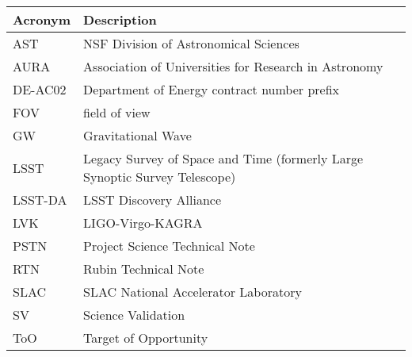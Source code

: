 \addtocounter{table}{-1}
\begin{longtable}{p{}p{}}\hline
\textbf{Acronym} & \textbf{Description}  \\\hline

AST & NSF Division of Astronomical Sciences \\\hline
AURA & Association of Universities for Research in Astronomy \\\hline
DE-AC02 & Department of Energy contract number prefix \\\hline
FOV & field of view \\\hline
GW & Gravitational Wave \\\hline
LSST & Legacy Survey of Space and Time (formerly Large Synoptic Survey Telescope) \\\hline
LSST-DA & LSST Discovery Alliance \\\hline
LVK & LIGO-Virgo-KAGRA \\\hline
PSTN & Project Science Technical Note \\\hline
RTN & Rubin Technical Note \\\hline
SLAC & SLAC National Accelerator Laboratory \\\hline
SV & Science Validation \\\hline
ToO & Target of Opportunity \\\hline
\end{longtable}
